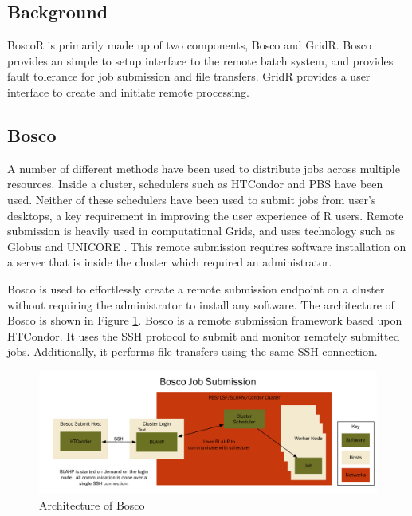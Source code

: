 \subsection{Background}
BoscoR is primarily made up of two components, Bosco and GridR.  Bosco provides an simple to setup interface to the remote batch system, and provides fault tolerance for job submission and file transfers.  GridR provides a user interface to create and initiate remote processing.

\subsection{Bosco}
A number of different methods have been used to distribute jobs across multiple resources.  Inside a cluster, schedulers such as HTCondor  \cite{litzkow1988condor} and PBS \cite{henderson1995job} have been used.  Neither of these schedulers have been used to submit jobs from user's desktops, a key requirement in improving the user experience of R users.  Remote submission is heavily used in computational Grids, and uses technology such as Globus \cite{foster2001globus} and UNICORE \cite{romberg2002unicore}. This remote submission requires software installation on a server that is inside the cluster which required an administrator.

Bosco \cite{weitzel2014accessing} is used to effortlessly create a remote submission endpoint on a cluster without requiring the administrator to install any software.  The architecture of Bosco is shown in Figure \ref{fig:boscoarch}.  Bosco is a remote submission framework based upon HTCondor.  It uses the SSH \cite{ylonen2006secure} protocol to submit and monitor remotely submitted jobs.  Additionally, it performs file transfers using the same SSH connection.

\begin{figure}[ht]
\centering
\includegraphics[width=\textwidth]{BoscoRImages/ArchitectureGraph1.pdf}
\caption{Architecture of Bosco}
\label{fig:boscoarch}
\end{figure}


